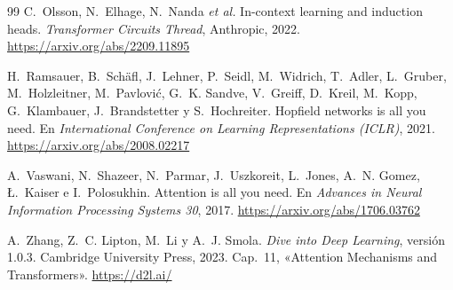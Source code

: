 \begin{thebibliography}{99}
C.~Olsson, N.~Elhage, N.~Nanda \emph{et al.}
\newblock In-context learning and induction heads.
\newblock \emph{Transformer Circuits Thread}, Anthropic, 2022.
\newblock \url{https://arxiv.org/abs/2209.11895}

H.~Ramsauer, B.~Schäfl, J.~Lehner, P.~Seidl, M.~Widrich, T.~Adler, L.~Gruber, M.~Holzleitner, M.~Pavlović, G.~K. Sandve, V.~Greiff, D.~Kreil, M.~Kopp, G.~Klambauer, J.~Brandstetter y S.~Hochreiter.
\newblock Hopfield networks is all you need.
\newblock En \emph{International Conference on Learning Representations (ICLR)}, 2021.
\newblock \url{https://arxiv.org/abs/2008.02217}

A.~Vaswani, N.~Shazeer, N.~Parmar, J.~Uszkoreit, L.~Jones, A.~N. Gomez, Ł.~Kaiser e I.~Polosukhin.
\newblock Attention is all you need.
\newblock En \emph{Advances in Neural Information Processing Systems 30}, 2017.
\newblock \url{https://arxiv.org/abs/1706.03762}

A.~Zhang, Z.~C. Lipton, M.~Li y A.~J. Smola.
\newblock \emph{Dive into Deep Learning}, versión 1.0.3.
\newblock Cambridge University Press, 2023.
\newblock Cap.~11, «Attention Mechanisms and Transformers».
\newblock \url{https://d2l.ai/}

\end{thebibliography}

